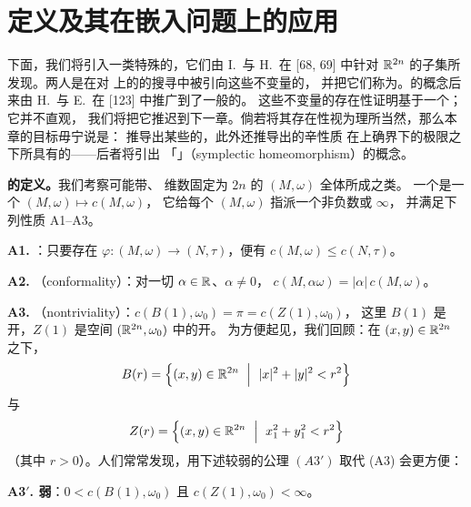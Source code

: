 
\section{定义及其在嵌入问题上的应用}
\label{sec:capacity-definition-embeddings}

下面，我们将引入一类特殊的\trSymplecticInvariant，它们由 I.~\trEkeland{}与%
H.~\trHofer{}在 [68, 69] 中针对 $\mathbb{R}^{2n}$ 的子集所发现。两人是在对%
\trConvex\trEnergySurface{}上的\trPeriodicSolution{}的搜寻中被引向这些不变量的，%
并把它们称为\trSymplecticCapacity。\trSymplecticCapacity{}的概念后来由%
H.~\trHofer{}与 E.~\trZehnder{}在 [123] 中推广到了一般的\trSymplecticManifold。%
这些不变量的存在性证明基于一个\trVariationalPrinciple；它并不直观，%
我们将把它推迟到下一章。倘若将其存在性视为理所当然，那么本章的目标毋宁说是：%
推导出某些\trSymplecticEmbedding{}的\trRigidity，此外还推导出\trMapping{}的辛性质%
在上确界\trNorm{}下的极限之下所具有的\trRigidity{}——后者将引出%
「\textbf{\trSymplecticHomeomorphism}」（symplectic homeomorphism）的概念。

\textbf{\trSymplecticCapacity{}的定义。}\quad 我们考察可能带\trBoundary、%
维数固定为 $2n$ 的\trSymplecticManifold{} $(M,\omega)$ 全体所成之类。%
一个\trSymplecticCapacity{}是一个\trMapping{} $(M,\omega)\mapsto c(M,\omega)$，%
它给每个\trSymplecticManifold{} $(M,\omega)$ 指派一个非负数或 $\infty$，%
并满足下列性质 A1--A3。

\textbf{A1. \trMonotonicity}：只要存在\trSymplecticEmbedding{}%
$\varphi:(M,\omega)\to(N,\tau)$，便有 $c(M,\omega)\leq c(N,\tau)$。

\textbf{A2. \trConformality}（conformality）：对一切 $\alpha\in\mathbb{R}$、$\alpha\neq0$，%
$c(M,\alpha\omega)=|\alpha|\,c(M,\omega)$。

\textbf{A3. \trNontriviality}（nontriviality）：$c(B(1),\omega_0)=\pi=c(Z(1),\omega_0)$，%
这里 $B(1)$ 是开\trUnitBall，$Z(1)$ 是\trStandard{}空间 $(\mathbb{R}^{2n},\omega_0)$ 中的开\trSymplectic\trCylinder。%
为方便起见，我们回顾：在\trSymplecticCoordinates{} $(x,y)\in\mathbb{R}^{2n}$ 之下，
\[
B(r)=\Bigl\{(x,y)\in\R^{2n}\ \Bigm|\ |x|^{2}+|y|^{2}<r^{2}\Bigr\}
\]
与
\[
Z(r)=\Bigl\{(x,y)\in\R^{2n}\ \Bigm|\ x_1^{2}+y_1^{2}<r^{2}\Bigr\}
\]
（其中 $r>0$）。人们常常发现，用下述较弱的公理 $(A3')$ 取代 (A3) 会更方便：

\textbf{A3$'$. 弱\trNontriviality}：$0<c(B(1),\omega_0)$ 且 $c(Z(1),\omega_0)<\infty$。

